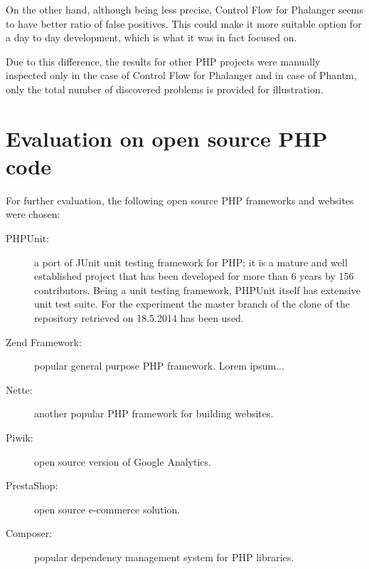 On the other hand, although being less precise, Control Flow for 
Phalanger seems to have better ratio of false positives. 
This could make it more suitable option for a day to day development, 
which is what it was in fact focused on. 

Due to this difference, the results for other PHP projects were 
manually inspected only in the case of Control Flow for Phalanger 
and in case of Phantm, only the total number of discovered problems 
is provided for illustration.


\section{Evaluation on open source PHP code}

For further evaluation, the following open source PHP frameworks and 
websites were chosen:

\begin{description}
    \item[PHPUnit:] a port of JUnit unit testing framework for PHP; it is a mature 
    and well established project that has been developed for more than 6 years 
    by 156 contributors. Being a unit testing framework, PHPUnit itself has extensive 
    unit test suite. For the experiment the master branch of the clone of the 
    repository retrieved on 18.5.2014 has been used. 
    
    \item[Zend Framework:] popular general purpose PHP framework. Lorem ipsum...
        
    \item[Nette:] another popular PHP framework for building websites.
        
    \item[Piwik:] open source version of Google Analytics. 
    
    \item[PrestaShop:] open source e-commerce solution. 
    
    \item[Composer:] popular dependency management system for PHP libraries. 
\end{description}

